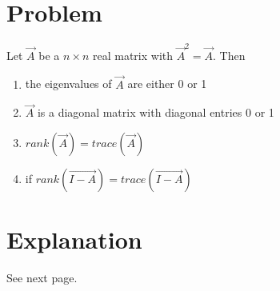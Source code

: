 \documentclass[journal,12pt,twocolumn]{IEEEtran}
\begin{document}
\section{Problem}
Let $\vec{A}$ be a $n\times n$ real matrix with $\vec{A}^2=\vec{A}$. Then
\begin{enumerate}
	\item the eigenvalues of $\vec{A}$ are either 0 or 1
	\item $\vec{A}$ is a diagonal matrix with diagonal entries 0 or 1
	\item $rank(\vec{A})=trace(\vec{A})$
	\item if $rank(\vec{I-A})=trace(\vec{I-A})$
\end{enumerate}
\section{Explanation}
See next page.
\end{document}
